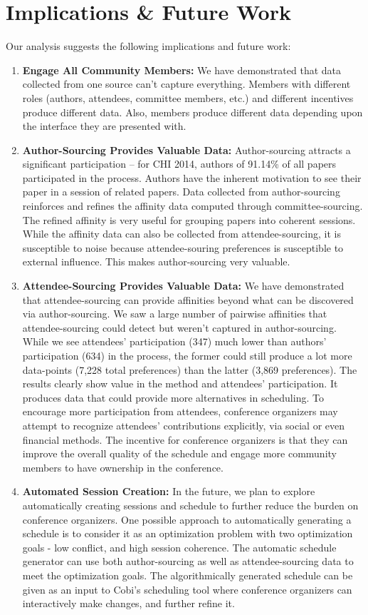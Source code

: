 \documentclass[letterpaper]{article}
\begin{document}
\section{Implications \& Future Work}
Our analysis suggests the following implications and future work:
\begin{enumerate}
\item \textbf{Engage All Community Members:} We have demonstrated that data collected from one source can't capture everything. Members with different roles (authors, attendees, committee members, etc.) and different incentives produce different data. Also, members produce different data depending upon the interface they are presented with.

\item \textbf{Author-Sourcing Provides Valuable Data:} Author-sourcing attracts a significant participation -- for CHI 2014, authors of 91.14\% of all papers participated in the process. Authors have the inherent motivation to see their paper in a session of related papers. Data collected from author-sourcing reinforces and refines the affinity data computed through committee-sourcing. The refined affinity is very useful for grouping papers into coherent sessions. While the affinity data can also be collected from attendee-sourcing, it is susceptible to noise because attendee-souring preferences is susceptible to external influence. This makes author-sourcing very valuable.

\item \textbf{Attendee-Sourcing Provides Valuable Data:} We have demonstrated that attendee-sourcing can provide affinities beyond what can be discovered via author-sourcing. We saw a large number of pairwise affinities that attendee-sourcing could detect but weren't captured in author-sourcing. While we see attendees' participation (347) much lower than authors' participation (634) in the process, the former could still produce a lot more data-points (7,228 total preferences) than the latter (3,869 preferences). The results clearly show value in the method and attendees' participation. It produces data that could provide more alternatives in scheduling. To encourage more participation from attendees, conference organizers may attempt to recognize attendees' contributions explicitly, via social or even financial methods. The incentive for conference organizers is that they can improve the overall quality of the schedule and engage more community members to have ownership in the conference.

\item \textbf{Automated Session Creation:} In the future, we plan to explore automatically creating sessions and schedule to further reduce the burden on conference organizers. One possible approach to automatically generating a schedule is to consider it as an optimization problem with two optimization goals - low conflict, and high session coherence. The automatic schedule generator can use both author-sourcing as well as attendee-sourcing data to meet the optimization goals. The algorithmically generated schedule can be given as an input to Cobi's scheduling tool where conference organizers can interactively make changes, and further refine it.


\end{enumerate}
\end{document}
